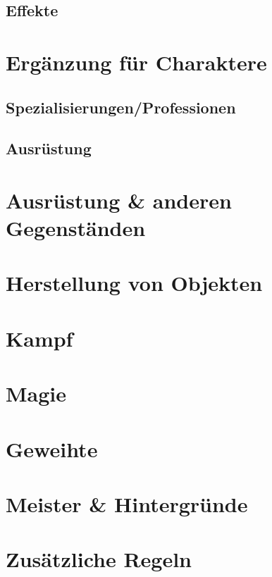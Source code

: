 \documentclass[a4paper,12pt,oneside]{book}
\begin{document}
\chapter{Effekte}

\part{Ergänzung für Charaktere}
\setcounter{chapter}{0}
\chapter{Spezialisierungen/Professionen}
\chapter{Ausrüstung}

\part{Ausrüstung \& anderen Gegenständen}
\setcounter{chapter}{0}
\part{Herstellung von Objekten}
\setcounter{chapter}{0}
\part{Kampf}
\setcounter{chapter}{0}
\part{Magie}
\setcounter{chapter}{0}
\part{Geweihte}
\setcounter{chapter}{0}
\part{Meister \& Hintergründe}
\setcounter{chapter}{0}
\part{Zusätzliche Regeln}
\setcounter{chapter}{0}
\end{document}
